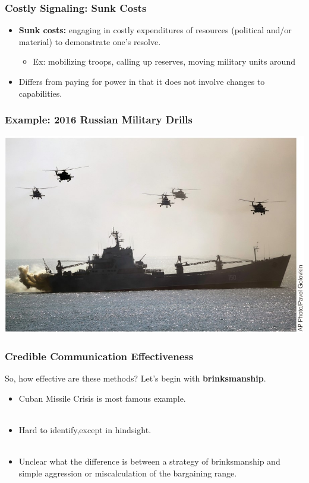 \documentclass[handout]{beamer}
\begin{document}
\begin{frame} 
	\frametitle{\LARGE{Costly Signaling: Sunk Costs}}
	\begin{itemize}
		\item \textbf{Sunk costs:} engaging in costly expenditures of resources (political and/or material) to demonstrate one's resolve. \pause
		\begin{itemize}
			\item Ex: mobilizing troops, calling up reserves, moving military units around \pause
		\end{itemize}
		\item Differs from paying for power in that it does not involve changes to capabilities.
	\end{itemize}
\end{frame}


\begin{frame}
	\frametitle{\LARGE{Example: 2016 Russian Military Drills}}
	\centering
	\includegraphics[width=\textwidth,height=0.8\textheight,keepaspectratio]{Russiadrill.jpg}
\end{frame}

\begin{frame} 
	\frametitle{\LARGE{Credible Communication Effectiveness}}
So, how effective are these methods? Let's begin with \textbf{brinksmanship}. \pause
	\begin{itemize}
		\item Cuban Missile Crisis is most famous example. \pause
		\\~\\
		\item Hard to identify,except in hindsight. \pause
		\\~\\
		\item Unclear what the difference is between a strategy of brinksmanship and simple aggression or miscalculation of the bargaining range.
	\end{itemize}
\end{frame}
\end{document}
